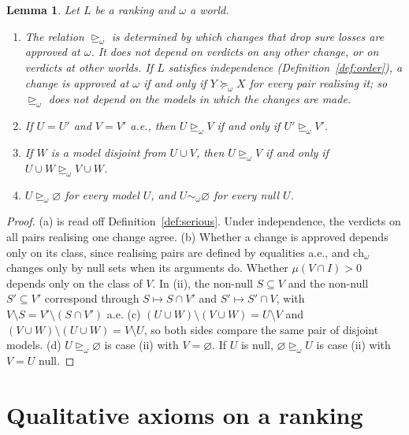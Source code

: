 \documentclass[11pt]{article}
\newtheorem{lemma}[theorem]{Lemma}
\theoremstyle{definition}
\newcommand{\ch}{\mathrm{ch}}
\newcommand{\sge}{\trianglerighteq}
\begin{document}
\begin{lemma}\label{lem:context}
Let $L$ be a ranking and $\omega$ a world.
\begin{enumerate}[label=(\alph*)]
\item The relation $\sge_\omega$ is determined by which changes that drop sure losses are approved at $\omega$. It does not depend on verdicts on any other change, or on verdicts at other worlds. If $L$ satisfies independence (Definition~\ref{def:order}), a change is approved at $\omega$ if and only if $Y\succeq_\omega X$ for every pair realising it; so $\sge_\omega$ does not depend on the models in which the changes are made.
\item If $U=U'$ and $V=V'$ a.e., then $U\sge_\omega V$ if and only if $U'\sge_\omega V'$.
\item If $W$ is a model disjoint from $U\cup V$, then $U\sge_\omega V$ if and only if $U\cup W\sge_\omega V\cup W$.
\item $U\sge_\omega\varnothing$ for every model $U$, and $U\sim_\omega\varnothing$ for every null $U$.
\end{enumerate}
\end{lemma}
\begin{proof}
(a) is read off Definition~\ref{def:serious}. Under independence, the verdicts on all pairs realising one change agree.
(b) Whether a change is approved depends only on its class, since realising pairs are defined by equalities a.e., and $\ch_\omega$ changes only by null sets when its arguments do. Whether $\mu(V\cap I)>0$ depends only on the class of $V$. In (ii), the non-null $S\subseteq V$ and the non-null $S'\subseteq V'$ correspond through $S\mapsto S\cap V'$ and $S'\mapsto S'\cap V$, with $V\setminus S=V'\setminus(S\cap V')$ a.e.
(c) $(U\cup W)\setminus(V\cup W)=U\setminus V$ and $(V\cup W)\setminus(U\cup W)=V\setminus U$, so both sides compare the same pair of disjoint models.
(d) $U\sge_\omega\varnothing$ is case (ii) with $V=\varnothing$. If $U$ is null, $\varnothing\sge_\omega U$ is case (ii) with $V=U$ null.
\end{proof}
\endgroup

\begingroup\color{red}
\section{Qualitative axioms on a ranking}\label{sec:axioms}
\end{document}
